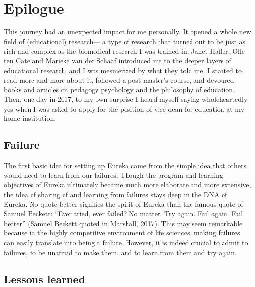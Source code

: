 \documentclass[authordate, editorial, issue]{jote-new-article}
\begin{document}
	\section{Epilogue}



	 This journey had an unexpected impact for me personally. It opened a whole new field of (educational) research— a type of research that turned out to be just as rich and complex as the biomedical research I was trained in. Janet Hafler, Olle ten Cate and Marieke van der Schaaf introduced me to the deeper layers of educational research, and I was mesmerized by what they told me. I started to read more and more about it, followed a post-master's course, and devoured books and articles on pedagogy psychology and the philosophy of education. Then, one day in 2017, to my own surprise I heard myself saying wholeheartedly yes when I was asked to apply for the position of vice dean for education at my home institution.







	\subsection{Failure}



	The first basic idea for setting up Eureka came from the simple idea that others would need to learn from our failures. Though the program and learning objectives of Eureka ultimately became much more elaborate and more extensive, the idea of sharing of and learning from failures stays deep in the DNA of Eureka. No quote better signifies the spirit of Eureka than the famous quote of Samuel Beckett: “Ever tried, ever failed? No matter. Try again. Fail again. Fail better” (Samuel Beckett quoted in Marshall, 2017). This may seem remarkable because in the highly competitive environment of life sciences, making failures can easily translate into being a failure. However, it is indeed crucial to admit to failures, to be unafraid to make them, and to learn from them and try again.







	\subsection{Lessons learned}
\end{document}
